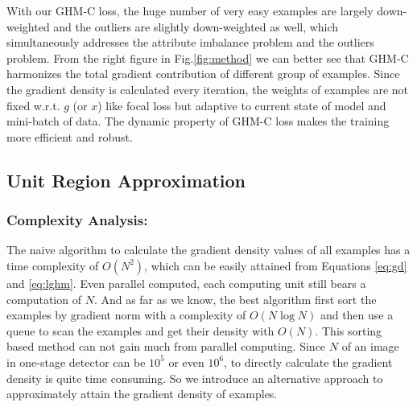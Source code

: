 \documentclass[letterpaper]{article} \usepackage{aaai19}  \usepackage{times}  \usepackage{helvet}  \usepackage{courier}  \usepackage{url}  \usepackage{graphicx}  \usepackage{amsmath,amssymb}
\begin{document}
With our GHM-C loss, the huge number of very easy examples are largely down-weighted and the outliers are slightly down-weighted as well, which simultaneously addresses the attribute imbalance problem and the outliers problem. From the right figure in Fig.\ref{fig:method} we can better see that GHM-C harmonizes the total gradient contribution of different group of examples. Since the gradient density is calculated every iteration, the weights of examples are not fixed w.r.t. $g$ (or $x$) like focal loss but adaptive to current state of model and mini-batch of data. The dynamic property of  GHM-C loss makes the training more efficient and robust.

\subsection{Unit Region Approximation}
\subsubsection{Complexity Analysis:} The naive algorithm to calculate the gradient density values of all examples has a time complexity of $O(N^2)$, which can be easily attained from Equations \ref{eq:gd} and \ref{eq:lghm}. Even parallel computed, each computing unit still bears a computation of $N$. And as far as we know, the best algorithm first sort the examples by gradient norm with a complexity of $O(N\log N)$ and then use a queue to scan the examples and get their density with $O(N)$. This sorting based method can not gain much from parallel computing. Since $N$ of an image in one-stage detector can be $10^5$ or even $10^6$, to directly calculate the gradient density is quite time consuming. So we introduce an alternative approach to approximately attain the gradient density of examples.
\end{document}
